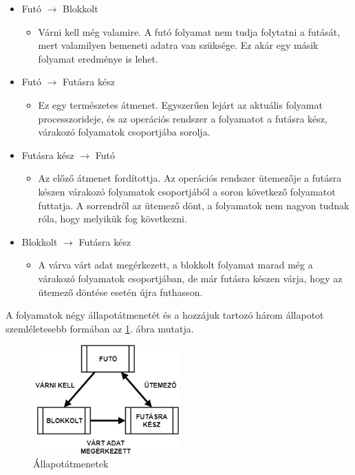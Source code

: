 \documentclass[tikz,12pt,margin=0px]{article}
\begin{document}
    \begin{itemize}[topsep=8pt,itemsep=4pt,partopsep=4pt, parsep=4pt]
        \item Futó $\rightarrow$ Blokkolt
            \begin{itemize}
                \item Várni kell még valamire. A futó folyamat nem tudja folytatni a futását, mert valamilyen bemeneti adatra van szüksége. Ez akár egy másik folyamat eredménye is lehet.
            \end{itemize}
        \item Futó $\rightarrow$ Futásra kész
            \begin{itemize}
                \item Ez egy természetes átmenet. Egyszerűen lejárt az aktuális folyamat processzorideje, és az operációs rendszer a folyamatot a futásra kész, várakozó folyamatok csoportjába sorolja.
            \end{itemize}
        \item Futásra kész $\rightarrow$ Futó
            \begin{itemize}
                \item Az előző átmenet fordítottja. Az operációs rendszer ütemezője a futásra készen várakozó folyamatok csoportjából a soron következő folyamatot futtatja. A sorrendről az ütemező dönt, a folyamatok nem nagyon tudnak róla, hogy melyikük fog következni.
            \end{itemize}
        \item Blokkolt $\rightarrow$ Futásra kész
            \begin{itemize}
                \item A várva várt adat megérkezett, a blokkolt folyamat marad még a várakozó folyamatok csoportjában, de már futásra készen várja, hogy az ütemező döntése esetén újra futhasson.
            \end{itemize}
    \end{itemize}

    \noindent A folyamatok négy állapotátmenetét és a hozzájuk tartozó három állapotot szemléletesebb formában az \ref{allapotatmentek}. ábra mutatja.

	\begin{figure}[H]
		\centering
		\includegraphics[width=0.5\textwidth]{img/allapot.png}
		\caption{Állapotátmenetek}
        \label{allapotatmentek}
	\end{figure}
\end{document}

